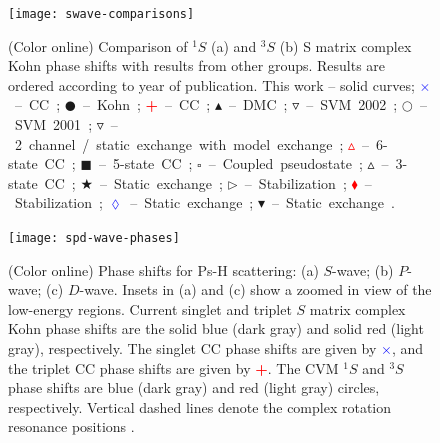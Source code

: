 \documentclass[preprint,showpacs,showkeys,preprintnumbers,amsmath,amssymb,longbibliography,pra,aps]{revtex4-1}
\begin{document}
{%
\begin{figure}[H]
	\centering
	\texttt{[image: swave-comparisons]}
	\caption{(Color online) Comparison of $^1S$ (a) and $^3S$ (b) S matrix
complex Kohn phase shifts with results from other groups. Results are ordered
according to year of publication. This work -- solid curves;
\mbox{\textcolor{blue}{$\times$} -- CC \cite{Walters2004};}
\mbox{$\CIRCLE$ -- Kohn \cite{VanReeth2003};}
\mbox{\textcolor{red}{\textbf{+}} -- CC \cite{Blackwood2002};}
\mbox{$\blacktriangle$ -- DMC \cite{Chiesa2002};} 
\mbox{$\triangledown$ -- SVM 2002 \cite{Ivanov2002};} 
\mbox{$\Circle$ -- SVM 2001 \cite{Ivanov2001};} 
\mbox{\textcolor[RGB]{0,127,0}{$\triangledown$} -- 2 channel / static exchange with model exchange \cite{Biswas2001};} 
\mbox{\textcolor{red}{$\vartriangle$} -- 6-state CC \cite{Sinha2000};} 
\mbox{$\blacksquare$ -- 5-state CC \cite{Adhikari1999};} 
\mbox{$\square$ -- Coupled pseudostate \cite{Campbell1998};} 
\mbox{$\vartriangle$ -- 3-state CC \cite{Sinha1997};} 
\mbox{\textcolor[RGB]{0,127,0}{$\bigstar$} -- Static exchange \cite{Ray1997,*Ray1996};} 
\mbox{$\triangleright$ -- Stabilization \cite{Drachman1976};} 
\mbox{\textcolor{red}{$\blacklozenge$} -- Stabilization \cite{Drachman1975};}
\mbox{\textcolor{blue}{$\lozenge$} -- Static exchange \cite{Hara1975};}
\mbox{$\blacktriangledown$ -- Static exchange \cite{Fraser1961}.}}
	\label{fig:swave-comparisons}
\end{figure}


\begin{figure}[H]
	\centering
	\texttt{[image: spd-wave-phases]}
	\caption{(Color online) Phase shifts for Ps-H scattering: (a) $S$-wave;
(b) $P$-wave; (c) $D$-wave. Insets in (a) and (c) show a zoomed in view of 
the low-energy regions. Current singlet and triplet $S$ matrix complex Kohn
phase shifts are the solid blue (dark gray)
and solid red (light gray), respectively. The singlet CC phase shifts
\cite{Walters2004} are given by \mbox{\textcolor{blue}{$\times$}}, and the
triplet CC phase shifts \cite{Blackwood2002} are given by
\mbox{\textcolor{red}{\textbf{+}}}. The CVM $^1S$ and $^3S$ phase shifts
\cite{Zhang2012} are blue (dark gray) and red (light gray) circles,
respectively. Vertical dashed lines denote the complex rotation resonance
positions \cite{Yan1999,Yan1998a,Ho1998}.}
	\label{fig:spd-wave-phases}
\end{figure}

}
\end{document}
